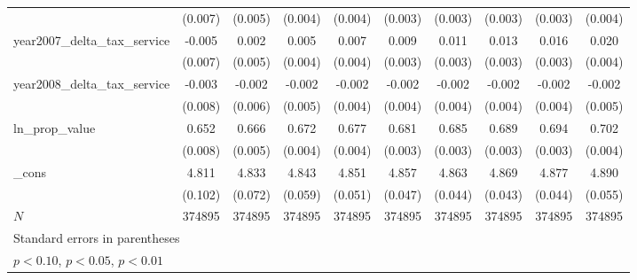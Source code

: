 {\begin{tabular}{l*{9}{c}}
            &     (0.007)         &     (0.005)         &     (0.004)         &     (0.004)         &     (0.003)         &     (0.003)         &     (0.003)         &     (0.003)         &     (0.004)         \\
[1em]
year2007_delta_tax_service&      -0.005         &       0.002         &       0.005         &       0.007\sym{**} &       0.009\sym{***}&       0.011\sym{***}&       0.013\sym{***}&       0.016\sym{***}&       0.020\sym{***}\\
            &     (0.007)         &     (0.005)         &     (0.004)         &     (0.004)         &     (0.003)         &     (0.003)         &     (0.003)         &     (0.003)         &     (0.004)         \\
[1em]
year2008_delta_tax_service&      -0.003         &      -0.002         &      -0.002         &      -0.002         &      -0.002         &      -0.002         &      -0.002         &      -0.002         &      -0.002         \\
            &     (0.008)         &     (0.006)         &     (0.005)         &     (0.004)         &     (0.004)         &     (0.004)         &     (0.004)         &     (0.004)         &     (0.005)         \\
[1em]
ln_prop_value&       0.652\sym{***}&       0.666\sym{***}&       0.672\sym{***}&       0.677\sym{***}&       0.681\sym{***}&       0.685\sym{***}&       0.689\sym{***}&       0.694\sym{***}&       0.702\sym{***}\\
            &     (0.008)         &     (0.005)         &     (0.004)         &     (0.004)         &     (0.003)         &     (0.003)         &     (0.003)         &     (0.003)         &     (0.004)         \\
[1em]
_cons       &       4.811\sym{***}&       4.833\sym{***}&       4.843\sym{***}&       4.851\sym{***}&       4.857\sym{***}&       4.863\sym{***}&       4.869\sym{***}&       4.877\sym{***}&       4.890\sym{***}\\
            &     (0.102)         &     (0.072)         &     (0.059)         &     (0.051)         &     (0.047)         &     (0.044)         &     (0.043)         &     (0.044)         &     (0.055)         \\
\hline
\(N\)       &      374895         &      374895         &      374895         &      374895         &      374895         &      374895         &      374895         &      374895         &      374895         \\
\hline\hline
\multicolumn{10}{p{\linewidth}}{\footnotesize Standard errors in parentheses}\\
\multicolumn{10}{p{\linewidth}}{\footnotesize \sym{*} \(p<0.10\), \sym{**} \(p<0.05\), \sym{***} \(p<0.01\)}\\
\end{tabular}
}
